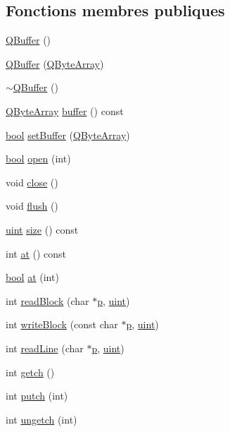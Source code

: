 \subsection*{Fonctions membres publiques}
\begin{DoxyCompactItemize}
\item 
\hyperlink{class_q_buffer_a89e6eb0af3076429fcaf14755f856d9a}{Q\+Buffer} ()
\item 
\hyperlink{class_q_buffer_ac88f81ed56581532b835e83812a8650a}{Q\+Buffer} (\hyperlink{qcstring_8h_ad6a390648110655c217fe072d45fbcf5}{Q\+Byte\+Array})
\item 
\hyperlink{class_q_buffer_a23e9bc1bae06f2c96e456d6b5ca1b52d}{$\sim$\+Q\+Buffer} ()
\item 
\hyperlink{qcstring_8h_ad6a390648110655c217fe072d45fbcf5}{Q\+Byte\+Array} \hyperlink{class_q_buffer_a7398620a68038fd3cc54bece01f92f1c}{buffer} () const 
\item 
\hyperlink{qglobal_8h_a1062901a7428fdd9c7f180f5e01ea056}{bool} \hyperlink{class_q_buffer_ad4c608788c2730ca60295488f75da423}{set\+Buffer} (\hyperlink{qcstring_8h_ad6a390648110655c217fe072d45fbcf5}{Q\+Byte\+Array})
\item 
\hyperlink{qglobal_8h_a1062901a7428fdd9c7f180f5e01ea056}{bool} \hyperlink{class_q_buffer_aa3ceff2217a13a570e0dcec157b23b18}{open} (int)
\item 
void \hyperlink{class_q_buffer_affd0b382476516b0d4e3adfaf27c0247}{close} ()
\item 
void \hyperlink{class_q_buffer_a5e16941f9973d0263ea1ef79b54bc88f}{flush} ()
\item 
\hyperlink{qglobal_8h_a4d3943ddea65db7163a58e6c7e8df95a}{uint} \hyperlink{class_q_buffer_a2e1a92c8a10018989540dda59bb4db18}{size} () const 
\item 
int \hyperlink{class_q_buffer_aee8ed63650b196c400fc9a94e55238f6}{at} () const 
\item 
\hyperlink{qglobal_8h_a1062901a7428fdd9c7f180f5e01ea056}{bool} \hyperlink{class_q_buffer_a4b4cd4e092b55db973fa34f76403b65d}{at} (int)
\item 
int \hyperlink{class_q_buffer_a7deacf4bbd599f075f3dad4b20cafeb0}{read\+Block} (char $\ast$\hyperlink{060__command__switch_8tcl_a15229b450f26d8fa1c10bea4f3279f4d}{p}, \hyperlink{qglobal_8h_a4d3943ddea65db7163a58e6c7e8df95a}{uint})
\item 
int \hyperlink{class_q_buffer_ad8bdac07e525a782d0759d3082bb296a}{write\+Block} (const char $\ast$\hyperlink{060__command__switch_8tcl_a15229b450f26d8fa1c10bea4f3279f4d}{p}, \hyperlink{qglobal_8h_a4d3943ddea65db7163a58e6c7e8df95a}{uint})
\item 
int \hyperlink{class_q_buffer_adcbf115b0d36683e6da2d3baa367382d}{read\+Line} (char $\ast$\hyperlink{060__command__switch_8tcl_a15229b450f26d8fa1c10bea4f3279f4d}{p}, \hyperlink{qglobal_8h_a4d3943ddea65db7163a58e6c7e8df95a}{uint})
\item 
int \hyperlink{class_q_buffer_abec634737e1d5a9b314e822737e51992}{getch} ()
\item 
int \hyperlink{class_q_buffer_aa05ca49f73284ac1fa2b01ffb3be2874}{putch} (int)
\item 
int \hyperlink{class_q_buffer_a52f9ebc674d0651e6fd89e148529bb50}{ungetch} (int)
\end{DoxyCompactItemize}
